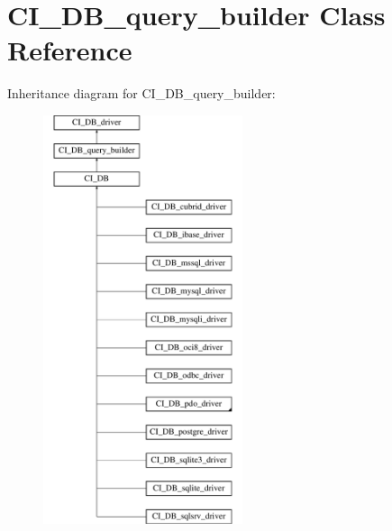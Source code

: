\hypertarget{class_c_i___d_b__query__builder}{}\section{C\+I\+\_\+\+D\+B\+\_\+query\+\_\+builder Class Reference}
\label{class_c_i___d_b__query__builder}
Inheritance diagram for C\+I\+\_\+\+D\+B\+\_\+query\+\_\+builder\+:\begin{figure}[H]
\begin{center}
\leavevmode
\includegraphics[height=12.000000cm]{class_c_i___d_b__query__builder}
\end{center}
\end{figure}
